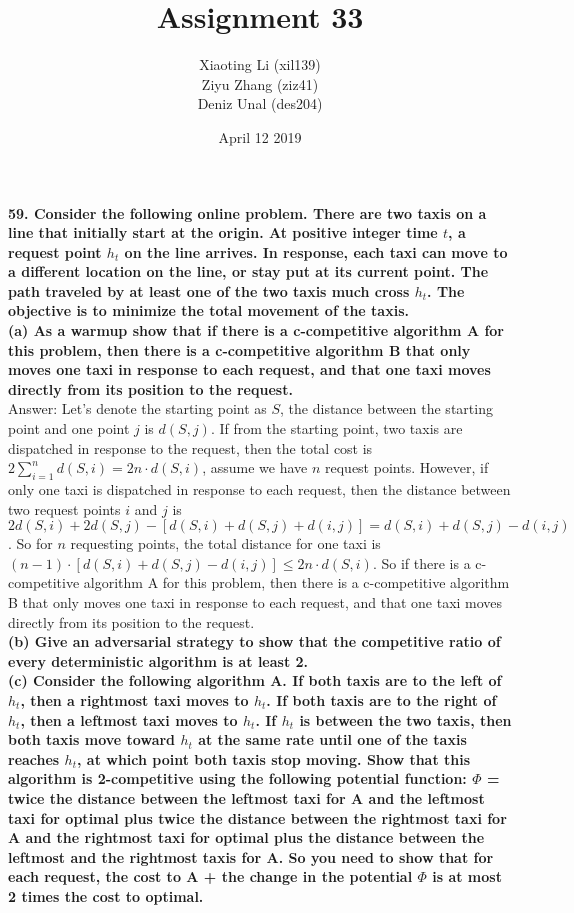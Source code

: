 \documentclass{article}
\title{Assignment 33}
\author{Xiaoting Li (xil139) \\
Ziyu Zhang (ziz41) \\
Deniz Unal (des204)}
\date{April 12 2019}
\begin{document}
\maketitle

\noindent
\textbf{59. Consider the following online problem. There are two taxis on a line that initially start at the origin. At positive integer time $t$, a request point $h_t$ on the line arrives. In response, each taxi can move to a different location on the line, or stay put at its current point. The path traveled by at least one of the two taxis much cross $h_t$. The objective is to minimize the total movement of the taxis.} \\ \newline
\textbf{(a) As a warmup show that if there is a c-competitive algorithm A for this problem, then there is a c-competitive algorithm B that only moves one taxi in response to each request, and that one taxi moves directly from its position to the request.}\\ \newline
Answer: Let's denote the starting point as $S$, the distance between the starting point and one point $j$ is $d(S, j)$. If from the starting point, two taxis are dispatched in response to the request, then the total cost is $2\sum_{i=1}^n d(S, i) = 2n\cdot d(S, i)$, assume we have $n$ request points. However, if only one taxi is dispatched in response to each request, then the distance between two request points $i$ and $j$ is $2d(S, i) + 2d(S, j) - [d(S, i) + d(S, j) + d(i, j)] = d(S, i) + d(S, j) - d(i, j)$. So for $n$ requesting points, the total distance for one taxi is $(n-1)\cdot [d(S, i) + d(S, j) - d(i, j)] \leq 2n\cdot d(S, i)$. So if there is a c-competitive algorithm A for this problem, then there is a c-competitive algorithm B that only moves one taxi in response to each request, and that one taxi moves directly from its position to the request.\\ \newline
\textbf{(b) Give an adversarial strategy to show that the competitive ratio of every deterministic algorithm is at least 2.} \\ \newline
\textbf{(c) Consider the following algorithm A. If both taxis are to the left of $h_t$, then a rightmost taxi moves to $h_t$. If both taxis are to the right of $h_t$, then a leftmost taxi moves to $h_t$. If $h_t$ is between the two taxis, then both taxis move toward $h_t$ at the same rate until one of the taxis reaches $h_t$, at which point both taxis stop moving. Show that this algorithm is 2-competitive using the following potential function: $\Phi$ = twice the distance between the leftmost taxi for A and the leftmost taxi for optimal plus twice the distance between the rightmost taxi for A and the rightmost taxi for optimal plus the distance between the leftmost and the rightmost taxis for A. So you need to show that for each request, the cost to A + the change in the potential $\Phi$ is at most 2 times the cost to optimal.
}\\ \newline
\end{document}

